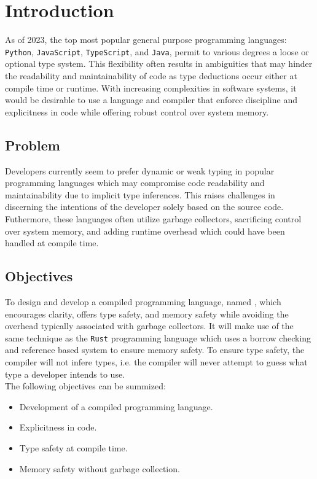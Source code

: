 \section{Introduction}
\label{sec:ProblemStatement}

As of 2023, the top most popular general purpose programming languages: \texttt{Python},
\texttt{JavaScript},
\texttt{TypeScript}, and \texttt{Java}, permit to various degrees a loose or optional type
system\cite{STACK}. This flexibility often results in ambiguities that may hinder the
readability and maintainability of code as type deductions occur either at compile
time or runtime. With increasing complexities in software systems, it would be
desirable to use a language and compiler that enforce discipline and explicitness in
code while offering robust control over system memory.

\subsection{Problem}

Developers currently seem to prefer dynamic or weak typing in popular programming
languages\cite{STACK} which may compromise code readability and maintainability due to implicit
type inferences. This raises challenges in discerning the intentions of the developer
solely based on the source code. Futhermore, these languages often utilize garbage
collectors, sacrificing control over system memory, and adding runtime overhead which
could have been handled at compile time.

\subsection{Objectives}
\label{sec:Objectives}

To design and develop a compiled programming language, named \lang{}, which encourages clarity, offers
type safety, and memory safety while avoiding the overhead typically associated with
garbage collectors. It will make use of the same technique as the \texttt{Rust} programming
language which uses a borrow checking and reference based system to ensure memory
safety\cite{RUST}. To ensure type safety, the \lang{} compiler will not infere types,
i.e. the compiler will never attempt to guess what type a developer intends to use. \\

The following objectives can be summized:

\begin{itemize}
  \item Development of a compiled programming language.
  \item Explicitness in code.
  \item Type safety at compile time.
  \item Memory safety without garbage collection.
\end{itemize}
